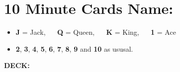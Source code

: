 \documentclass[landscape,letterpaper]{article}
\begin{document}
\thispagestyle{empty}
\section*{10 Minute Cards \hspace{12cm}    Name:}
\begin{itemize}
\item \textbf{J} = Jack, $\quad$ \textbf{Q} = Queen, $\quad$ \textbf{K} = King, $\quad$ \textbf{1} = Ace
\item \textbf{2}, \textbf{3}, \textbf{4}, \textbf{5}, \textbf{6}, \textbf{7}, \textbf{8}, \textbf{9} and \textbf{10} as ususal.
\end{itemize}
{\large \textbf{DECK:}}
\end{document}
